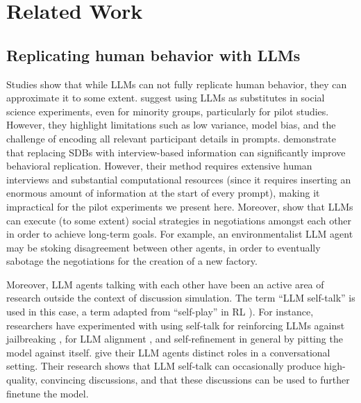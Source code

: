 %

\section{Related Work}


\subsection{Replicating human behavior with LLMs}

Studies show that while \acp{LLM} can not fully replicate human behavior, they can approximate it to some extent. \textcite{hewitt2024predicting} suggest using \acp{LLM} as substitutes in social science experiments, even for minority groups, particularly for pilot studies. However, they highlight limitations such as low variance, model bias, and the challenge of encoding all relevant participant details in prompts. \textcite{park2024generativeagentsimulations1000} demonstrate that replacing \acp{SDB} with interview-based information can significantly improve behavioral replication. However, their method requires extensive human interviews and substantial computational resources (since it requires inserting an enormous amount of information at the start of every prompt), making it impractical for the pilot experiments we present here. Moreover, \textcite{abdelnabi2024cooperationcompetitionmaliciousnessllmstakeholders} show that \acp{LLM} can execute (to some extent) social strategies in negotiations amongst each other in order to achieve long-term goals. For example, an environmentalist \ac{LLM} agent may be stoking disagreement between other agents, in order to eventually sabotage the negotiations for the creation of a new factory.

Moreover, \ac{LLM} agents talking with each other have been an active area of research outside the context of discussion simulation. The term “\ac{LLM} self-talk” is used in this case, a term adapted from “self-play” in \ac{RL} \parencite{cheng2024selfplayingadversariallanguagegame}). For instance, researchers have experimented with using self-talk for reinforcing \acp{LLM} against jailbreaking \cite{liu2024largelanguagemodelsagents, cheng2024selfplayingadversariallanguagegame, zheng2024optimalllmalignmentsusing}, for \ac{LLM} alignment \cite{Bai2022ConstitutionalAH, collective_constitution}, and self-refinement in general \cite{Madaan2023SelfRefineIR, lambert2024selfdirectedsyntheticdialoguesrevisions} by pitting the model against itself. \textcite{ulmer2024bootstrappingllmbasedtaskorienteddialogue} give their \ac{LLM} agents distinct roles in a conversational setting. Their research shows that \ac{LLM} self-talk can occasionally produce high-quality, convincing discussions, and that these discussions can be used to further finetune the model.  

